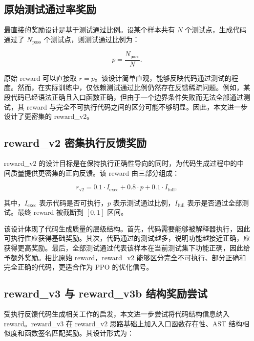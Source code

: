 \subsection{原始测试通过率奖励}

最直接的奖励设计是基于测试通过比例。设某个样本共有 $N$ 个测试点，生成代码通过了 $N_{\mathrm{pass}}$ 个测试点，则测试通过比例为：

\begin{equation}
  p=\frac{N_{\mathrm{pass}}}{N}.
\end{equation}

原始 reward 可以直接取 $r=p$。该设计简单直观，能够反映代码通过测试的程度。然而，在实际训练中，仅依赖测试通过比例仍然存在反馈稀疏问题。例如，某段代码已经语法正确且入口函数正确，但由于一个边界条件失败而无法全部通过测试，其 reward 与完全不可执行代码之间的区分可能不够明显。因此，本文进一步设计了更密集的 reward\_v2。

\subsection{reward\_v2 密集执行反馈奖励}

reward\_v2 的设计目标是在保持执行正确性导向的同时，为代码生成过程中的中间质量提供更密集的正向反馈。该 reward 由三部分组成：

\begin{equation}
  r_{\mathrm{v2}}
  = 0.1 \cdot I_{\mathrm{exec}}
  + 0.8 \cdot p
  + 0.1 \cdot I_{\mathrm{full}},
\end{equation}

其中，$I_{\mathrm{exec}}$ 表示代码是否可执行，$p$ 表示测试通过比例，$I_{\mathrm{full}}$ 表示是否通过全部测试。最终 reward 被截断到 $[0,1]$ 区间。

该设计体现了代码生成质量的层级结构。首先，代码需要能够被解释器执行，因此可执行性应获得基础奖励。其次，代码通过的测试越多，说明功能越接近正确，应获得更高奖励。最后，全部测试通过代表该样本在当前测试集下功能正确，因此给予额外奖励。相比原始 reward，reward\_v2 能够区分完全不可执行、部分正确和完全正确的代码，更适合作为 PPO 的优化信号。

\subsection{reward\_v3 与 reward\_v3b 结构奖励尝试}

受执行反馈代码生成相关工作的启发，本文进一步尝试将代码结构信息纳入 reward。reward\_v3 在 reward\_v2 思路基础上加入入口函数存在性、AST 结构相似度和函数签名匹配奖励。其设计形式为：

